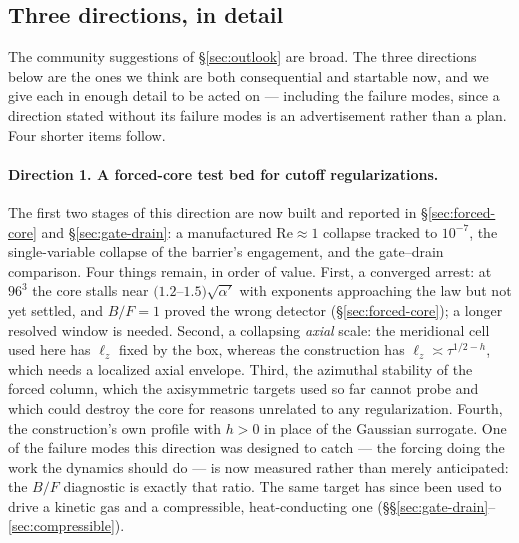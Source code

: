 \documentclass[11pt,a4paper]{article}
\begin{document}
\subsection{Three directions, in detail}
\label{sec:directions}

The community suggestions of \S\ref{sec:outlook} are broad. The three directions below are the
ones we think are both consequential and startable now, and we give each in enough detail to be
acted on --- including the failure modes, since a direction stated without its failure modes is an
advertisement rather than a plan. Four shorter items follow.

\paragraph{Direction 1. A forced-core test bed for cutoff regularizations.}
The first two stages of this direction are now built and reported in \S\ref{sec:forced-core} and
\S\ref{sec:gate-drain}: a manufactured $\mathrm{Re}\approx1$ collapse tracked to $10^{-7}$, the
single-variable collapse of the barrier's engagement, and the gate--drain comparison. Four things
remain, in order of value. First, a converged arrest: at $96^3$ the core stalls near
$(1.2$--$1.5)\sqrt{\alpha'}$ with exponents approaching the law but not yet settled, and $B/F=1$ proved
the wrong detector (\S\ref{sec:forced-core}); a longer resolved window is needed. Second, a collapsing
\emph{axial} scale: the meridional cell used here has $\ell_z$ fixed by the box, whereas the
construction has $\ell_z\asymp\tau^{1/2-h}$, which needs a localized axial envelope. Third, the
azimuthal stability of the forced column, which the axisymmetric targets used so far cannot probe
and which could destroy the core for reasons unrelated to any regularization. Fourth, the
construction's own profile with $h>0$ in place of the Gaussian surrogate. One of the failure modes
this direction was designed to catch --- the forcing doing the work the dynamics should do --- is
now measured rather than merely anticipated: the $B/F$ diagnostic is exactly that ratio. The same
target has since been used to drive a kinetic gas and a compressible, heat-conducting one
(\S\S\ref{sec:gate-drain}--\ref{sec:compressible}).
\end{document}
